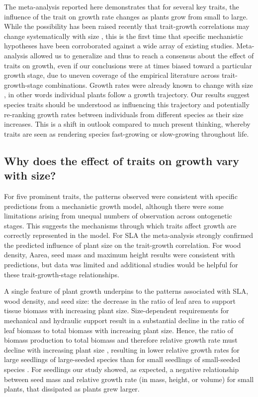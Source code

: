 \documentclass[a4paper,11pt]{article}
\begin{document}
The meta-analysis reported here demonstrates that for several key traits, the influence of the trait on growth rate changes as plants grow from small to large. While the possibility has been raised recently that trait-growth correlations may change systematically with size \citep{Falster:2011ii, Ruger:2012jv, Iida:2014ep, Iida:2014hq}, this is the first time that specific mechanistic hypotheses have been corroborated against a wide array of existing studies. Meta-analysis allowed us to generalize and thus to reach a consensus about the effect of traits on growth, even if our conclusions were at times biased toward a particular growth stage, due to uneven coverage of the empirical literature across trait-growth-stage combinations. Growth rates were already known to change with size \citep{Condit:1993hd, Clark:1999ed, Herault:2011dd}, in other words individual plants follow a growth trajectory. Our results suggest species traits should be understood as influencing this trajectory and potentially re-ranking growth rates between individuals from different species as their size increases. This is a shift in outlook compared to much present thinking, whereby traits are seen as rendering species fast-growing or slow-growing throughout life.

\subsection*{Why does the effect of traits on growth vary with size?}

For five prominent traits, the patterns observed were consistent with specific predictions from a mechanistic growth model, although there were some limitations arising from unequal numbers of observation across ontogenetic stages. This suggests the mechanisms through which traits affect growth are correctly represented in the model. For SLA the meta-analysis strongly confirmed the predicted influence of plant size on the trait-growth correlation. For wood density, Aarea, seed mass and maximum height results were consistent with predictions, but data was limited and additional studies would be helpful for these trait-growth-stage relationships.

A single feature of plant growth underpins to the patterns associated with SLA, wood density, and seed size: the decrease in the ratio of leaf area to support tissue biomass with increasing plant size. Size-dependent requirements for mechanical and hydraulic support result in a substantial decline in the ratio of leaf biomass to total biomass with increasing plant size. Hence, the ratio of biomass production to total biomass and therefore relative growth rate must decline with increasing plant size \citep{Givnish:1995ta, Enquist:2007ek}, resulting in lower relative growth rates for large seedlings of large-seeded species than for small seedlings of small-seeded species \citep[reviewed by][]{Turnbull:2012ew}. For seedlings our study showed, as expected, a negative relationship between seed mass and relative growth rate (in mass, height, or volume) for small plants, that dissipated as plants grew larger.
\end{document}
